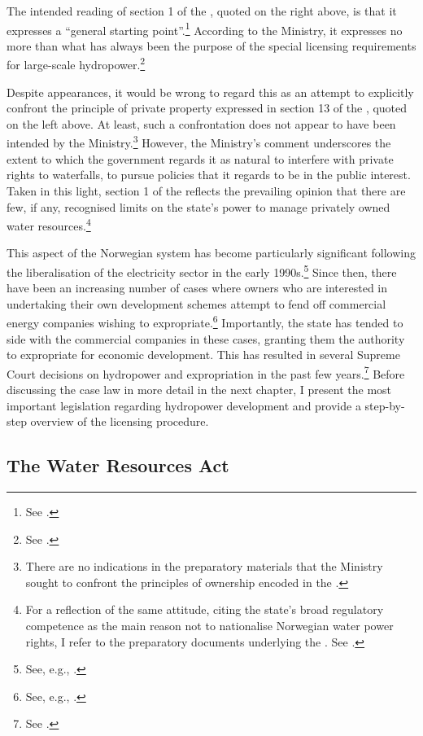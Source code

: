 The intended reading of section 1 of the \cite{ica17}, quoted on the right above, is that it expresses a ``general starting point''.\footnote{See \cite[72]{otprp61}.} According to the Ministry, it expresses no more than what has always been the purpose of the special licensing requirements for large-scale hydropower.\footnote{See \cite[72]{otprp61}.}

Despite appearances, it would be wrong to regard this as an attempt to explicitly confront the principle of private property expressed in section 13 of the \cite{wra00}, quoted on the left above. At least, such a confrontation does not appear to have been intended by the Ministry.\footnote{There are no indications in the preparatory materials that the Ministry sought to confront the principles of ownership encoded in the \cite{wra00}.} However, the Ministry's comment underscores the extent to which the government regards it as natural to interfere with private rights to waterfalls, to pursue policies that it regards to be in the public interest. Taken in this light, section 1 of the \cite{ica17} reflects the prevailing opinion that there are few, if any, recognised limits on the state's power to manage privately owned water resources.\footnote{For a reflection of the same attitude, citing the state's broad regulatory competence as the main reason not 
to nationalise Norwegian water power rights, I refer to the preparatory documents underlying the \cite{wra00}. See \cite[152-153]{nou94}.}

This aspect of the Norwegian system has become particularly significant following the liberalisation of the electricity sector in the early 1990s.\footnote{See, e.g., \cite{larsen06}.} Since then, there have been an increasing number of cases where owners who are interested in undertaking their own development schemes attempt to fend off commercial energy companies wishing to expropriate.\footnote{See, e.g., \cite{sofienlund07}.} Importantly, the state has tended to side with the commercial companies in these cases, granting them the authority to expropriate for economic development. This has resulted in several Supreme Court decisions on hydropower and expropriation in the past few years.\footnote{See \cite{uleberg08,otra10,jorpeland11,klovtveit11,otra13}.} Before discussing the case law in more detail in the next chapter, I present the most important legislation regarding hydropower development and provide a step-by-step overview of the licensing procedure.

\subsection{The Water Resources Act}\label{sec:wra00}

